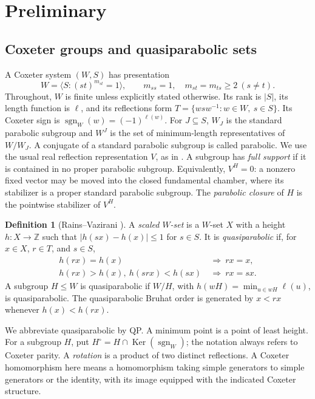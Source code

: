 \documentclass[11pt]{article}
\numberwithin{equation}{section}
\theoremstyle{definition}
\newtheorem{definition}[theorem]{Definition}
\DeclareMathOperator{\sgn}{sgn}
\DeclareMathOperator{\Ker}{Ker}
\newcommand{\Z}{\mathbb Z}
\begin{document}
\section{Preliminary}
\label{sec:prelim}

\subsection{Coxeter groups and quasiparabolic sets}

A Coxeter system \((W,S)\) has presentation
\[
 W=\langle S:(st)^{m_{st}}=1\rangle,
 \qquad m_{ss}=1,\quad m_{st}=m_{ts}\geq2\ (s\ne t).
\]
Throughout, \(W\) is finite unless explicitly stated otherwise.
Its rank is \(|S|\), its length function is \(\ell\), and its reflections form
\(T=\{wsw^{-1}:w\in W,\ s\in S\}\).
Its Coxeter sign is \(\sgn_W(w)=(-1)^{\ell(w)}\).
For \(J\subseteq S\), \(W_J\) is the standard parabolic subgroup and \(W^J\) is the set of minimum-length representatives of \(W/W_J\).
A conjugate of a standard parabolic subgroup is called parabolic.
We use the usual real reflection representation \(V\), as in \cite{Humphreys,BB}.
A subgroup has \emph{full support} if it is contained in no proper parabolic subgroup.
Equivalently, \(V^H=0\): a nonzero fixed vector may be moved into the closed fundamental chamber, where its stabilizer is a proper standard parabolic subgroup.
The \emph{parabolic closure} of \(H\) is the pointwise stabilizer of \(V^H\).

\begin{definition}[Rains--Vazirani \cite{RV}]
\label{def:qp}
A \emph{scaled \(W\)-set} is a \(W\)-set \(X\) with a height \(h:X\to\Z\) such that
\(|h(sx)-h(x)|\leq1\) for \(s\in S\).
It is \emph{quasiparabolic} if, for \(x\in X\), \(r\in T\), and \(s\in S\),
\begin{align}
 h(rx)=h(x)&\ \Longrightarrow\ rx=x, \tag{QP1}\label{eq:QP1}\\
 h(rx)>h(x),\ h(srx)<h(sx)&\ \Longrightarrow\ rx=sx. \tag{QP2}\label{eq:QP2}
\end{align}
A subgroup \(H\leq W\) is quasiparabolic if \(W/H\), with
\(h(wH)=\min_{u\in wH}\ell(u)\), is quasiparabolic.
The quasiparabolic Bruhat order is generated by \(x<rx\) whenever \(h(x)<h(rx)\).
\end{definition}

We abbreviate quasiparabolic by QP.
A minimum point is a point of least height.
For a subgroup \(H\), put \(H^\circ=H\cap\Ker(\sgn_W)\); the notation always refers to Coxeter parity.
A \emph{rotation} is a product of two distinct reflections.
A Coxeter homomorphism here means a homomorphism taking simple generators to simple generators or the identity, with its image equipped with the indicated Coxeter structure.
\end{document}
